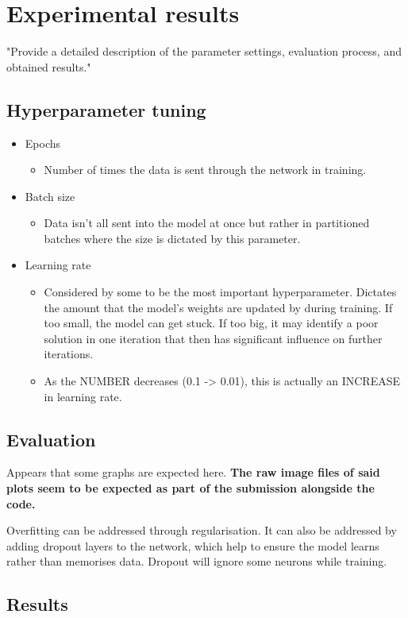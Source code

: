 \chapter{Experimental results}
"Provide a detailed description of the
parameter settings, evaluation process, and obtained results."

\section{Hyperparameter tuning}

\begin{itemize}
    \item Epochs \begin{itemize}
        \item Number of times the data is sent through the network in training.
    \end{itemize}
    \item Batch size \begin{itemize}
        \item Data isn't all sent into the model at once but rather in partitioned batches 
        where the size is dictated by this parameter.
    \end{itemize}
    \item Learning rate \begin{itemize}
        \item Considered by some to be the most important hyperparameter. Dictates the 
        amount that the model's weights are updated by during training. If too small,
        the model can get stuck. If too big, it may identify a poor solution in one 
        iteration that then has significant influence on further iterations.
        \item As the NUMBER decreases (0.1 -> 0.01), this is actually an INCREASE 
        in learning rate.
    \end{itemize}
    
\end{itemize}


\section{Evaluation}
Appears that some graphs are expected here. \textbf{The raw image files of said plots seem to be 
expected as part of the submission alongside the code.}


Overfitting can be addressed through regularisation. It can also be addressed by adding dropout layers 
to the network, which help to ensure the model learns rather than memorises data. Dropout will ignore some 
neurons while training.

\section{Results}
